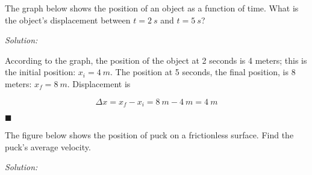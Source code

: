 \documentclass[dvipsnames]{article}
\begin{document}
\begin{example} \label{DYQyq}
The graph below shows the position of an object as a function of time. What is the object's displacement between $t = \SI{2}{s}$ and $t = \SI{5}{s}$?

\begin{center}
\end{center}
\end{example}

\textit{Solution:}

According to the graph, the position of the object at 2 seconds is 4 meters; this is the initial position: $x_i = \SI{4}{m}$. The position at 5 seconds, the final position, is 8 meters: $x_f = \SI{8}{m}$. Displacement is

\begin{equation*}
    \Delta x = x_f - x_i = \SI{8}{m} - \SI{4}{m} = \boxed{\SI{4}{m}}
\end{equation*}

\hfill $\blacksquare$

\begin{example} \label{flMbk}
The figure below shows the position of puck on a frictionless surface. Find the puck's average velocity. 


\begin{center}
\end{center}
\end{example}

\textit{Solution:}
\end{document}
